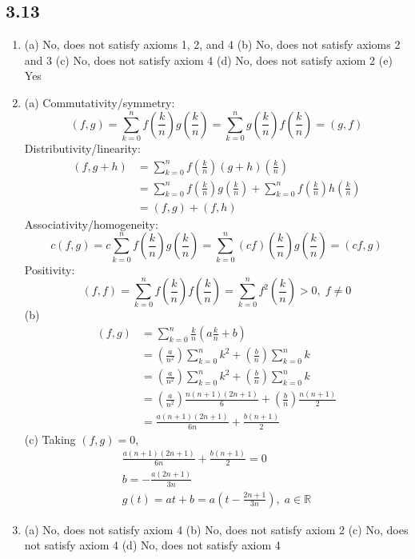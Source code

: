 \documentclass[a4paper,12pt]{article}
\begin{document}
	\subsection*{3.13}
	\begin{enumerate}
		\item (a) No, does not satisfy axioms 1, 2, and 4
		(b) No, does not satisfy axioms 2 and 3
		(c) No, does not satisfy axiom 4
		(d) No, does not satisfy axiom 2
		(e) Yes

		\setcounter{enumi}{9}
		\item (a) Commutativity/symmetry:
		\[ (f, g) = \sum_{k = 0}^{n} f\left(\frac{k}{n}\right) g\left(\frac{k}{n}\right) = \sum_{k = 0}^{n} g\left(\frac{k}{n}\right) f\left(\frac{k}{n}\right) = (g, f) \]
		Distributivity/linearity:
		\begin{align*}
		(f, g + h) &= \sum_{k = 0}^{n} f\left(\frac{k}{n}\right) (g + h)\left(\frac{k}{n}\right) \\
		&= \sum_{k = 0}^{n} f\left(\frac{k}{n}\right) g\left(\frac{k}{n}\right) + \sum_{k = 0}^{n} f\left(\frac{k}{n}\right) h\left(\frac{k}{n}\right) \\
		&= (f, g) + (f, h)
		\end{align*}
		Associativity/homogeneity:
		\[ c(f, g) = c\sum_{k = 0}^{n} f\left(\frac{k}{n}\right) g\left(\frac{k}{n}\right) = \sum_{k = 0}^{n} (cf)\left(\frac{k}{n}\right) g\left(\frac{k}{n}\right) = (cf, g) \]
		Positivity:
		\[ (f, f) = \sum_{k = 0}^{n} f\left(\frac{k}{n}\right) f\left(\frac{k}{n}\right) = \sum_{k = 0}^{n} f^2\left(\frac{k}{n}\right) > 0, \; f \neq 0 \]
		(b) \begin{align*}
		(f, g) &= \sum_{k = 0}^{n} \frac{k}{n}\left( a\frac{k}{n} + b \right) \\
		&= \left( \frac{a}{n^2} \right) \sum_{k = 0}^{n}k^2 + \left( \frac{b}{n} \right) \sum_{k = 0}^{n}k \\
		&= \left( \frac{a}{n^2} \right) \sum_{k = 0}^{n}k^2 + \left( \frac{b}{n} \right) \sum_{k = 0}^{n}k \\
		&= \left( \frac{a}{n^2} \right) \frac{n(n + 1)(2n + 1)}{6} + \left( \frac{b}{n} \right) \frac{n(n + 1)}{2} \\
		&= \frac{a(n + 1)(2n + 1)}{6n} + \frac{b(n + 1)}{2}
		\end{align*}
		(c) Taking $(f, g) = 0$,
		\begin{gather*}
		\frac{a(n + 1)(2n + 1)}{6n} + \frac{b(n + 1)}{2} = 0 \\
		b = -\frac{a(2n + 1)}{3n} \\
		g(t) = at + b = a\left( t - \frac{2n + 1}{3n} \right), \; a \in \mathbb{R}
		\end{gather*}
		
		\setcounter{enumi}{13}
		\item (a) No, does not satisfy axiom 4
		(b) No, does not satisfy axiom 2
		(c) No, does not satisfy axiom 4
		(d) No, does not satisfy axiom 4
	\end{enumerate}
	
\end{document}
